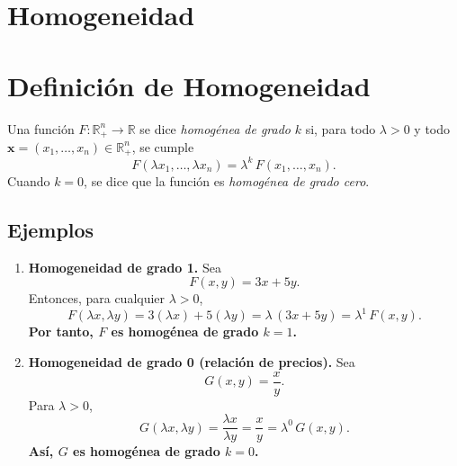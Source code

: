 \documentclass{article}
\begin{document}
\newpage

\section{Homogeneidad}

\section*{Definición de Homogeneidad}
Una función \(F:\mathbb{R}^n_{+}\to\mathbb{R}\) se dice \emph{homogénea de grado} \(k\) si, para todo \(\lambda>0\) y todo \(\mathbf{x}=(x_1,\dots,x_n)\in\mathbb{R}^n_{+}\), se cumple
\[
F(\lambda x_1,\dots,\lambda x_n)
=\lambda^k\,F(x_1,\dots,x_n).
\]
Cuando \(k=0\), se dice que la función es \emph{\color{teal} homogénea de grado cero}.


\subsection*{Ejemplos}

\begin{enumerate}
  \item \textbf{Homogeneidad de grado 1.}  
    Sea
    \[
      F(x,y) = 3x + 5y.
    \]
    Entonces, para cualquier \(\lambda>0\),
    \[
      F(\lambda x,\lambda y)
      =3(\lambda x) + 5(\lambda y)
      =\lambda\,(3x+5y)
      =\lambda^1\,F(x,y).
    \]
\textbf{\color{teal}    Por tanto, \(F\) es homogénea de grado \(k=1\).
}
  \item \textbf{Homogeneidad de grado 0 (relación de precios).}  
    Sea
    \[
      G(x,y) = \frac{x}{y}.
    \]
    Para \(\lambda>0\),
    \[
      G(\lambda x,\lambda y)
      =\frac{\lambda x}{\lambda y}
      =\frac{x}{y}
      =\lambda^0\,G(x,y).
    \]
\textbf{  \color{teal}  Así, \(G\) es homogénea de grado \(k=0\).}

\end{enumerate}
\end{document}
